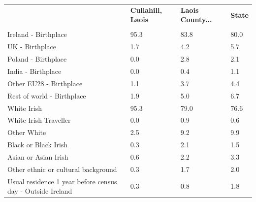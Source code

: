 \documentclass{article}
\begin{document}
\pagebreak
\begin{table}[h]	
\centering
		\begin{tabular}{KTTT}
  \hline
& \textbf{Cullahill, Laois} & \textbf{Laois County...} & \textbf{State}\\ 
  \hline
    \\ 
    \hline
Ireland - Birthplace & 95.3& 83.8& 80.0\\
UK - Birthplace & 1.7& 4.2& 5.7\\
Poland - Birthplace & 0.0& 2.8& 2.1\\
India - Birthplace & 0.0& 0.4& 1.1\\
Other EU28 - Birthplace & 1.1& 3.7& 4.4\\
Rest of world - Birthplace & 1.9& 5.0& 6.7\\
    \hline
White Irish & 95.3& 79.0& 76.6\\
White Irish Traveller & 0.0& 0.9& 0.6\\
Other White & 2.5& 9.2& 9.9\\
Black or Black Irish & 0.3& 2.1& 1.5\\
Asian or Asian Irish & 0.6& 2.2& 3.3\\
Other ethnic or cultural background & 0.3& 1.7& 2.0\\
    \hline
Usual residence 1 year before census day - Outside Ireland & 0.3& 0.8& 1.8\\


\end{tabular}
\end{table}
\end{document}
